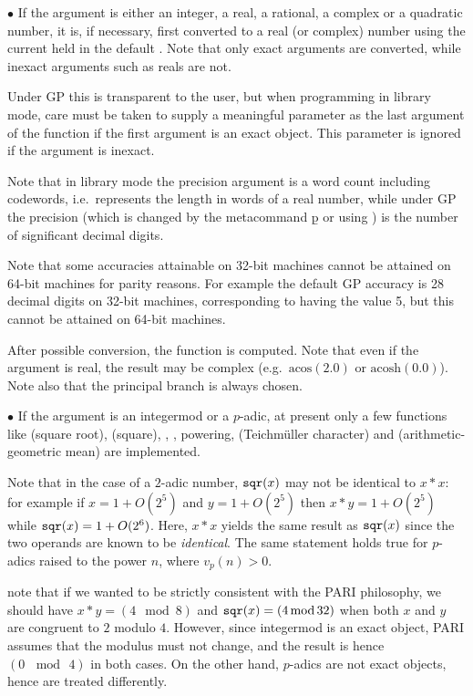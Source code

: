 $\bullet$ If the argument is either an integer, a real, a rational, a complex
or a quadratic number, it is, if necessary, first converted to a real (or
complex) number using the current  held in the default
. Note that only exact arguments are converted, while
inexact arguments such as reals are not.

Under GP this is transparent to the user, but when programming in library
mode, care must be taken to supply a meaningful parameter  as the
last argument of the function if the first argument is an exact object.
This parameter is ignored if the argument is inexact.

   Note that in library mode the precision argument  is a word
count including codewords, i.e.~represents the length in words of a real
number, while under GP the precision (which is changed by the metacommand
\b{p} or using ) is the number of significant
decimal digits.

Note that some accuracies attainable on 32-bit machines cannot be attained
on 64-bit machines for parity reasons. For example the default GP accuracy
is 28 decimal digits on 32-bit machines, corresponding to  having
the value 5, but this cannot be attained on 64-bit machines.\smallskip

After possible conversion, the function is computed. Note that even if the
argument is real, the result may be complex (e.g.~$\text{acos}(2.0)$ or
$\text{acosh}(0.0)$). Note also that the principal branch is always chosen.

$\bullet$ If the argument is an integermod or a $p$-adic, at present only a
few functions like  (square root),  (square), ,
, powering,  (Teichm\"uller character) and
 (arithmetic-geometric mean) are implemented.

Note that in the case of a $2$-adic number, ${\tt sqr}(x)$ may not be
identical to $x*x$: for example if $x = 1+O(2^5)$ and $y = 1+O(2^5)$ then
$x*y = 1+O(2^5)$ while ${\tt sqr}(x) = 1+O(2^6)$. Here, $x * x$ yields the
same result as ${\tt sqr}(x)$ since the two operands are known to be
\emph{identical}. The same statement holds true for $p$-adics raised to the
power $n$, where $v_p(n) > 0$.

 note that if we wanted to be strictly consistent with
the PARI philosophy, we should have $x*y = (4 \mod 8)$ and ${\tt sqr}(x) =
(4 \,{\rm mod}\, 32)$ when both $x$ and $y$ are congruent to $2$ modulo $4$.
However, since integermod is an exact object, PARI assumes that the modulus
must not change, and the result is hence $(0\, \mod\, 4)$ in both cases. On
the other hand, $p$-adics are not exact objects, hence are treated
differently.

